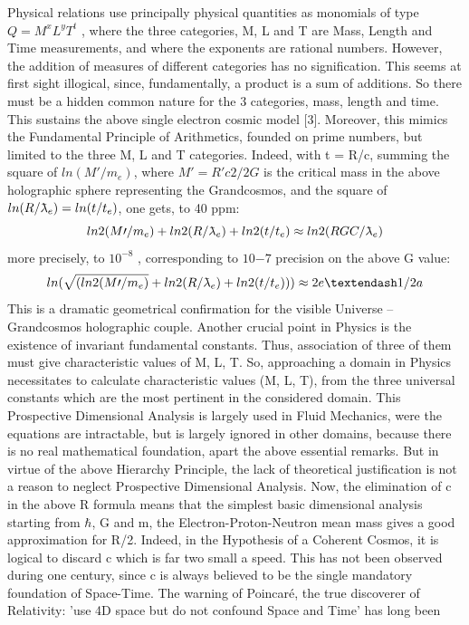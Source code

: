 Physical relations use principally physical quantities as monomials of type $Q = M^{x} L^{y} T^{t}$ , where
the three categories, M, L and T are Mass, Length and Time measurements, and where the exponents are
rational numbers. However, the addition of measures of different categories has no signification.
This seems at first sight illogical, since, fundamentally, a product is a sum of additions. So there
must be a hidden common nature for the 3 categories, mass, length and time. This sustains the
above single electron cosmic model [3]. Moreover, this mimics the Fundamental Principle of
Arithmetics, founded on prime numbers, but limited to the three M, L and T categories. Indeed, with t =
R/c, summing the square of $ln(M\prime/m_{e} )$, where $M\prime = R\prime c 2 /2G$ is the critical mass in the above
holographic sphere representing the Grandcosmos, and the square of $ln(R/\lambdabar_{e} ) = ln(t/t_{e} )$, one gets, to
40 ppm:
$$ln 2 (M\prime/m_{e} ) + ln 2 (R/\lambdabar_{e}) + ln 2 (t/t_{e} ) \approx ln 2 (R GC /\lambdabar_{e} )$$
more precisely, to $10^{-8}$ , corresponding to $10{-7}$ precision on the above G value:
$$ln(\sqrt{(ln 2 (M\prime/m_{e} )} + ln 2 (R/\lambdabar_{e} ) + ln 2 (t/t_{e} ))) \approx 2e – 1/2a$$
This is a dramatic geometrical confirmation for the visible Universe – Grandcosmos holographic
couple.
Another crucial point in Physics is the existence of invariant fundamental constants. Thus,
association of three of them must give characteristic values of M, L, T. So, approaching a domain in
Physics necessitates to calculate characteristic values (M, L, T), from the three universal constants
which are the most pertinent in the considered domain. This Prospective Dimensional Analysis is
largely used in Fluid Mechanics, were the equations are intractable, but is largely ignored in other
domains, because there is no real mathematical foundation, apart the above essential remarks. But
in virtue of the above Hierarchy Principle, the lack of theoretical justification is not a reason to
neglect Prospective Dimensional Analysis.
Now, the elimination of c in the above R formula means that the simplest basic dimensional
analysis starting from $\hbar$, G and m, the Electron-Proton-Neutron mean mass gives a good
approximation for R/2. Indeed, in the Hypothesis of a Coherent Cosmos, it is logical to discard c
which is far two small a speed. This has not been observed during one century, since c is always
believed to be the single mandatory foundation of Space-Time. The warning of Poincaré, the true
discoverer of Relativity: 'use 4D space but do not confound Space and Time' has long been
